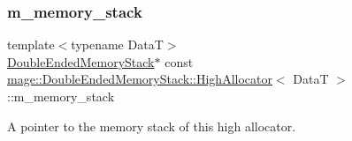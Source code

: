 \subsubsection{\texorpdfstring{m\+\_\+memory\+\_\+stack}{m\_memory\_stack}}
{\footnotesize\ttfamily template$<$typename DataT$>$ \\
\hyperlink{classmage_1_1_double_ended_memory_stack}{Double\+Ended\+Memory\+Stack}$\ast$ const \hyperlink{structmage_1_1_double_ended_memory_stack_1_1_high_allocator}{mage\+::\+Double\+Ended\+Memory\+Stack\+::\+High\+Allocator}$<$ DataT $>$\+::m\+\_\+memory\+\_\+stack\hspace{0.3cm}{\ttfamily [private]}}

A pointer to the memory stack of this high allocator. 